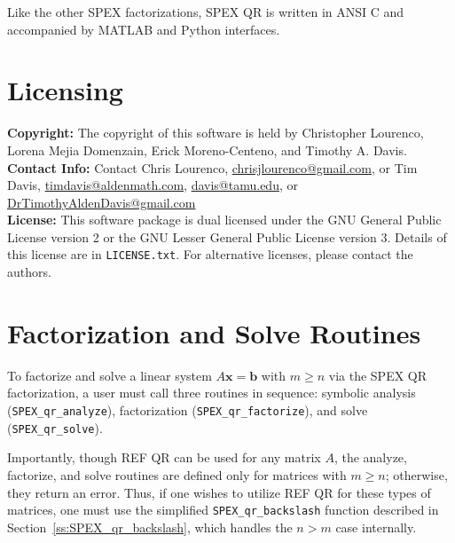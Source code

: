\documentclass[12pt,oneside]{book}
\theoremstyle{definition}
\renewcommand{\b}{\mathbf{b}}
\newcommand{\x}{\mathbf{x}}
\begin{document}
Like the other SPEX factorizations, SPEX QR is written in ANSI C and accompanied by MATLAB and Python interfaces.

\section{Licensing}
\textbf{Copyright:} The copyright of this software is held by Christopher Lourenco, Lorena Mejia Domenzain, Erick Moreno-Centeno, and Timothy A. Davis.\\
\noindent \textbf{Contact Info:} Contact Chris Lourenco,
\href{mailto:chrisjlourenco@gmail.com}{chrisjlourenco@gmail.com}, or Tim Davis,
\href{mailto:timdavis@aldenmath.com}{timdavis@aldenmath.com},
\href{mailto:davis@tamu.edu}{davis@tamu.edu}, or
\href{mailto:DrTimothyAldenDavis@gmail.com}{DrTimothyAldenDavis@gmail.com}\\

\noindent \textbf{License:} This software package is dual licensed under the GNU General Public License version 2 or the GNU Lesser General Public License version 3. Details of this license are in 
\verb|LICENSE.txt|.
For alternative licenses, please contact the authors.

\section{Factorization and Solve Routines}
To factorize and solve a linear system $A \x = \b$ with $m \ge n$ via the SPEX QR factorization, a user must call three routines in sequence: symbolic analysis (\verb|SPEX_qr_analyze|), factorization (\verb|SPEX_qr_factorize|), and solve (\verb|SPEX_qr_solve|).

Importantly, though REF QR can be used for any matrix $A$, the analyze, factorize, and solve routines are defined only for matrices with $m \geq n$; otherwise, they return an error. Thus, if one wishes to utilize REF QR for these types of matrices, one must use the simplified \verb|SPEX_qr_backslash| function described in Section~\ref{ss:SPEX_qr_backslash}, which handles the $n > m$ case
internally.

\end{document}

